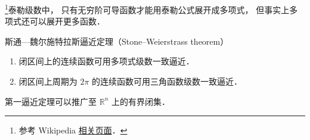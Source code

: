 

\footnote{参考 Wikipedia \href{https://en.wikipedia.org/wiki/Stone–Weierstrass theorem}{相关页面}．}泰勒级数中， 只有无穷阶可导函数才能用泰勒公式展开成多项式， 但事实上多项式还可以展开更多函数．

\begin{theorem}{斯通—魏尔施特拉斯逼近定理（Stone–Weierstrass theorem）}
\begin{enumerate}
斯通—魏尔施特拉斯逼近定理有两个
\item 闭区间上的连续函数可用多项式级数一致逼近．
\item 闭区间上周期为 $2\pi$ 的连续函数可用三角函数级数一致逼近．
\end{enumerate}
第一逼近定理可以推广至 $\mathbb {R}^{n}$ 上的有界闭集．
\end{theorem}
